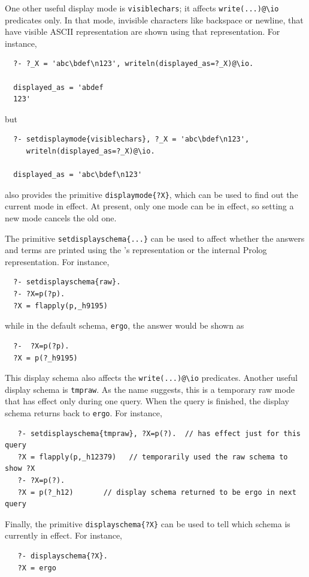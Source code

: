 \documentclass[11pt]{article}
\newcommand{\ERGO}{\mbox{\smaller{\ensuremath{\cal{E}}\smaller{{\sc{RGO}}}}}\xspace}
\newcommand{\FLSYSTEM}{\ERGO}
\newcommand{\bs}{\textbackslash}
\begin{document}
One other useful display mode is \texttt{visiblechars}; it
affects \texttt{write(...)@\bs{}io}
predicates only. In that mode,
invisible characters like backspace or newline, that have visible ASCII
representation are shown using that representation. For instance,
\begin{verbatim}
  ?- ?_X = 'abc\bdef\n123', writeln(displayed_as=?_X)@\io.

  displayed_as = 'abdef
  123'
\end{verbatim}
but
\begin{verbatim}
  ?- setdisplaymode{visiblechars}, ?_X = 'abc\bdef\n123',
     writeln(displayed_as=?_X)@\io.

  displayed_as = 'abc\bdef\n123'
\end{verbatim}

\FLSYSTEM also provides the
primitive \texttt{displaymode\{?X\}}, which can be used to find out the
current mode in effect. At present, only one mode can be in effect, so
setting a new mode cancels the old one.

The primitive \texttt{setdisplayschema\{...\}} can be used to affect
whether the answers and terms are printed using the \FLSYSTEM's
representation or the internal Prolog representation. For instance,
\begin{verbatim}
  ?- setdisplayschema{raw}.
  ?- ?X=p(?p).
  ?X = flapply(p,_h9195)
\end{verbatim}
while in the default schema, \texttt{ergo},
the answer would be shown as
\begin{verbatim}
  ?-  ?X=p(?p).
  ?X = p(?_h9195)
\end{verbatim}
This display schema also affects the \texttt{write(...)@\bs{}io} predicates. 
Another useful display schema is \texttt{tmpraw}. As the name suggests,
this is a temporary raw mode that has effect only during one query. When
the query is finished, the display schema returns back to
\texttt{ergo}. For instance,
\begin{verbatim}
   ?- setdisplayschema{tmpraw}, ?X=p(?).  // has effect just for this query
   ?X = flapply(p,_h12379)   // temporarily used the raw schema to show ?X
   ?- ?X=p(?).
   ?X = p(?_h12)       // display schema returned to be ergo in next query
\end{verbatim}

Finally, the primitive \texttt{displayschema\{?X\}} can be used to tell
which schema is currently in effect. 
For instance,
\begin{verbatim}
   ?- displayschema{?X}.
   ?X = ergo
\end{verbatim}
\end{document}
